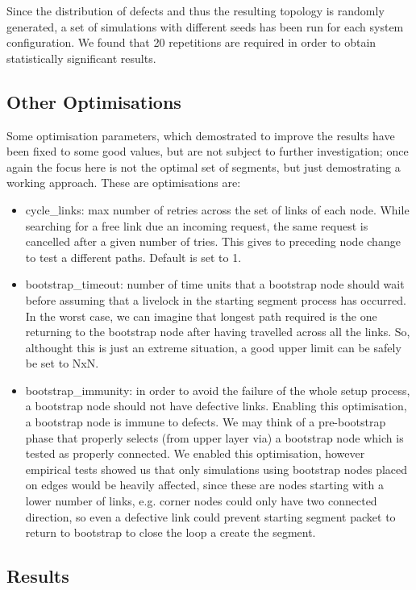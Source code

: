 Since the distribution of defects and thus the resulting topology is randomly
generated, a set of simulations with different seeds has been run
for each system configuration. We found that 20 repetitions are
required in order to obtain statistically significant results.

\subsection{Other Optimisations}
Some optimisation parameters, which demostrated to improve the \disr{}
results have been fixed to some good values, but are not subject to
further investigation; once again the focus here is not the
optimal set of segments, but just demostrating a working approach. 
These are optimisations are:
\begin{itemize}
\item{cycle\_links}: max number of retries across the set of links of
each node. While searching for a free link due an incoming request,
the same request is cancelled after a given number of tries. This
gives to preceding node change to test a different paths. Default is set to 1.
\item{bootstrap\_timeout}: number of time units that a bootstrap node
should wait before assuming that a livelock in the starting segment
process has occurred. In the worst case, we can imagine that longest
path required is the one returning to the bootstrap node after having
travelled across all the links. So, althought this is just an extreme
situation, a good upper limit can be safely be set to NxN.
\item{bootstrap\_immunity}: in order to avoid the failure of the whole \disr{}
setup process, a bootstrap node should not have defective links.
Enabling this optimisation, a bootstrap node is immune to defects.
We may think of a pre-bootstrap phase that properly selects (from upper
layer via) a bootstrap node which is tested as properly connected. We
enabled this optimisation, however empirical tests showed us that only
simulations using bootstrap nodes placed on edges would be heavily
affected, since these are nodes starting with a lower number of links,
e.g. corner nodes could only have two connected direction, so even a
defective link could prevent starting segment packet to return to
bootstrap to close the loop a create the segment.
\end{itemize}

\subsection{Results}
\label{sec:results}

